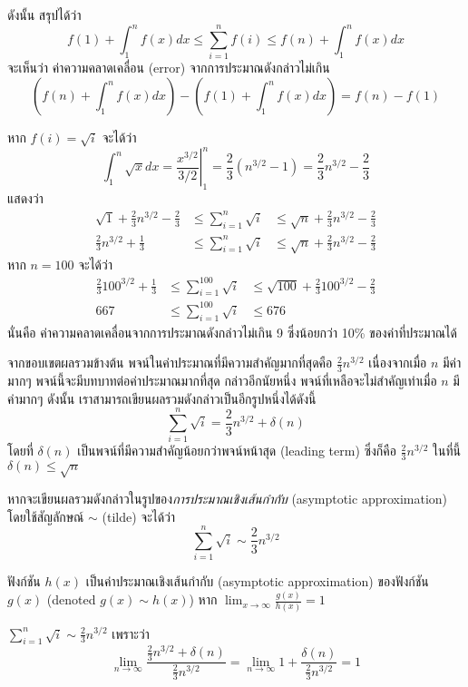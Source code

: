 ดังนั้น สรุปได้ว่า \[f(1)+\int_1^n{f(x)dx} \leq \sum_{i=1}^{n}{f(i)} \leq f(n)+\int_1^n{f(x)dx}\] จะเห็นว่า ค่าความคลาดเคลื่อน (error) จากการประมาณดังกล่าวไม่เกิน \[\left(f(n)+\int_1^n{f(x)dx}\right)-\left(f(1)+\int_1^n{f(x)dx}\right)=f(n)-f(1)\]

\begin{example}
หาก $f(i)=\sqrt{i}$ จะได้ว่า \[\int_1^n{\sqrt{x}dx}=\left.\frac{x^{3/2}}{3/2}\right|_1^n=\frac{2}{3}(n^{3/2}-1)=\frac{2}{3}n^{3/2}-\frac{2}{3}\] แสดงว่า \[
\begin{array}{rcl}
\sqrt{1}+\frac{2}{3}n^{3/2}-\frac{2}{3} &\leq \sum_{i=1}^{n}{\sqrt{i}} &\leq \sqrt{n}+\frac{2}{3}n^{3/2}-\frac{2}{3} \\
\frac{2}{3}n^{3/2}+\frac{1}{3} &\leq \sum_{i=1}^{n}{\sqrt{i}} &\leq \sqrt{n}+\frac{2}{3}n^{3/2}-\frac{2}{3}
\end{array}
\]
หาก $n=100$ จะได้ว่า \[
\begin{array}{rcl}
\frac{2}{3}100^{3/2}+\frac{1}{3} &\leq \sum_{i=1}^{100}{\sqrt{i}} &\leq \sqrt{100}+\frac{2}{3}100^{3/2}-\frac{2}{3} \\
667 &\leq \sum_{i=1}^{100}{\sqrt{i}} &\leq 676
\end{array}
\]
นั่นคือ ค่าความคลาดเคลื่อนจากการประมาณดังกล่าวไม่เกิน 9 ซึ่งน้อยกว่า 10\% ของค่าที่ประมาณได้

จากขอบเขตผลรวมข้างต้น พจน์ในค่าประมาณที่มีความสำคัญมากที่สุดคือ $\frac{2}{3}n^{3/2}$ เนื่องจากเมื่อ $n$ มีค่ามากๆ พจน์นี้จะมีบทบาทต่อค่าประมาณมากที่สุด \enskip กล่าวอีกนัยหนึ่ง พจน์ที่เหลือจะไม่สำคัญเท่าเมื่อ $n$ มีค่ามากๆ \enskip ดังนั้น เราสามารถเขียนผลรวมดังกล่าวเป็นอีกรูปหนึ่งได้ดังนี้ \[\sum_{i=1}^{n}{\sqrt{i}}=\frac{2}{3}n^{3/2}+\delta(n)\] โดยที่ $\delta(n)$ เป็นพจน์ที่มีความสำคัญน้อยกว่าพจน์หน้าสุด (leading term) ซึ่งก็คือ $\frac{2}{3}n^{3/2}$ \enskip ในที่นี้ $\delta(n)\leq\sqrt{n}$

หากจะเขียนผลรวมดังกล่าวในรูปของ\emph{การประมาณเชิงเส้นกำกับ} (asymptotic approximation) โดยใช้สัญลักษณ์ $\sim$ (tilde) จะได้ว่า \[\sum_{i=1}^{n}{\sqrt{i}}\sim\frac{2}{3}n^{3/2}\]
\end{example}

\begin{definition}
ฟังก์ชัน $h(x)$ เป็นค่าประมาณเชิงเส้นกำกับ (asymptotic approximation) ของฟังก์ชัน $g(x)$ (denoted $g(x)\sim h(x)$) หาก $\lim_{x\to\infty}{\frac{g(x)}{h(x)}}=1$
\end{definition}
%
\begin{example}
$\sum_{i=1}^{n}{\sqrt{i}}\sim\frac{2}{3}n^{3/2}$ เพราะว่า \[\lim_{n\to\infty}\frac{\frac{2}{3}n^{3/2}+\delta(n)}{\frac{2}{3}n^{3/2}}=\lim_{n\to\infty}{1+\frac{\delta(n)}{\frac{2}{3}n^{3/2}}}=1\]
\end{example}

